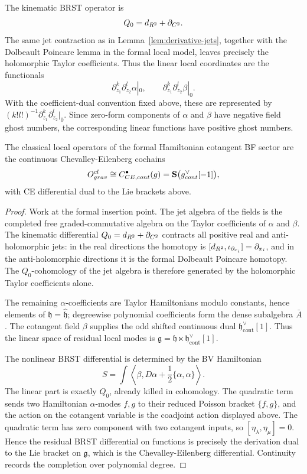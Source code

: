 \documentclass[11pt]{memoir}
\begin{document}
The kinematic BRST operator is
$$Q_0=d_{R^2}+\partial_{C^2}.$$
The same jet contraction as in Lemma~\ref{lem:derivative-jets}, together with
the Dolbeault Poincare lemma in the formal local model, leaves precisely the
holomorphic Taylor coefficients. Thus the linear local coordinates are the
functionals
$$\partial_{z_1}^k\partial_{z_2}^l\alpha|_0,\qquad
  \partial_{z_1}^k\partial_{z_2}^l\beta|_0.$$
With the coefficient-dual convention fixed above, these are represented by
$(k!l!)^{-1}\partial_{z_1}^k\partial_{z_2}^l|_0$. Since zero-form components of
$\alpha$ and $\beta$ have negative field ghost numbers, the corresponding
linear functions have positive ghost numbers.

\begin{prop}\label{prop:grav-ops}
  The classical local operators of the formal Hamiltonian cotangent BF sector are
  the continuous Chevalley-Eilenberg cochains
  $$O^{cl}_{grav}
    \cong C^\bullet_{CE,cont}(g)
    =\mathbf{S}\bigl(g^\vee_{cont}[-1]\bigr),$$
  with CE differential dual to the Lie brackets above.
\end{prop}

\begin{proof}
  Work at the formal insertion point. The jet algebra of the fields is the
  completed free graded-commutative algebra on the Taylor coefficients of
  $\alpha$ and $\beta$. The kinematic differential
  $Q_0=d_{R^2}+\partial_{C^2}$ contracts all positive real and
  anti-holomorphic jets: in the real directions the homotopy is
  $[d_{R^2},\iota_{\partial_{x_i}}]=\partial_{x_i}$, and in the
  anti-holomorphic directions it is the formal Dolbeault Poincare homotopy.
  The $Q_0$-cohomology of the jet algebra is therefore generated by the
  holomorphic Taylor coefficients alone.

  The remaining $\alpha$-coefficients are Taylor Hamiltonians modulo constants,
  hence elements of $\mathfrak h=\widehat{\mathfrak h}$; degreewise polynomial
  coefficients form the dense subalgebra $\bar A$. The cotangent field $\beta$
  supplies the odd shifted continuous dual
  $\mathfrak h^\vee_{\mathrm{cont}}[1]$. Thus the
  linear space of residual local modes is
  $\mathfrak g=\mathfrak h\ltimes\mathfrak h^\vee_{\mathrm{cont}}[1]$.

  The nonlinear BRST differential is determined by the BV Hamiltonian
  $$S=\int\left\langle\beta,D\alpha+\frac12\{\alpha,\alpha\}\right\rangle.$$
  The linear part is exactly $Q_0$, already killed in cohomology. The quadratic
  term sends two Hamiltonian $\alpha$-modes $f,g$ to their reduced Poisson
  bracket $\{f,g\}$, and the action on the cotangent variable is the coadjoint
  action displayed above. The quadratic term has zero component with two
  cotangent inputs, so $[\eta_\lambda,\eta_\mu]=0$. Hence the residual BRST differential on
  functions is precisely the derivation dual to the Lie bracket on
  $\mathfrak g$, which is the Chevalley-Eilenberg differential. Continuity
  records the completion over polynomial degree.
\end{proof}
\end{document}
